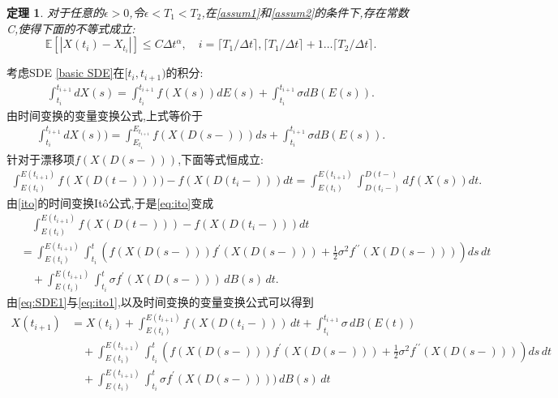 \documentclass[12pt,final]{article}
\makeatletter
\numberwithin{equation}{section}
\numberwithin{figure}{section}
\numberwithin{table}{section}
\theoremstyle{plain}
\renewcommand{\proofname}{证明}
\newtheorem{Theorem}{定理}[section]   %
\theoremstyle{Definition}
\theoremstyle{Remark}
\renewenvironment{proof}[1][\proofname]{\par
	\pushQED{\qed}%
	\normalfont \topsep6\p@\@plus6\p@\relax
	\trivlist\item[\hskip\labelsep
	\bfseries #1\@addpunct{\,:\,}]\ignorespaces
}{%
	\popQED\endtrivlist\@endpefalse
}
\makeatother
\begin{document}
	\begin{Theorem}\label{main th}
		对于任意的$\epsilon>0$,令$\epsilon < T_1 < T_2$,在\textnormal{\cref{assum1}}和\textnormal{\cref{assum2}}的条件下,存在常数C,使得下面的不等式成立:
		$$\mathbb{E}[|X({t_i})-X_{t_i}|]\le C\Delta t^\alpha,\quad i=\lceil T_1/\Delta t \rceil,\lceil T_1/\Delta t \rceil+1 \ldots \lceil T_2/\Delta t \rceil.$$
	\end{Theorem}
	\begin{proof}
		
		考虑SDE \eqref{basic SDE}在$[t_i,t_{i+1})$的积分:
		\begin{align}
			\int_{t_i}^{t_{i+1}}dX(s)=\int_{t_i}^{t_{i+1}}f(X(s))dE(s)+\int_{t_i}^{t_{i+1}}\sigma dB(E(s)).
		\end{align}
		由时间变换的变量变换公式\cite{kobayashi2011stochastic},上式等价于
		\begin{align}\label{eq:SDE1}
			\int_{t_i}^{t_{i+1}}dX(s))=\int_{E_{t_i}}^{E_{t_{i+1}}}f(X(D(s-)))ds+\int_{t_i}^{t_{i+1}}\sigma dB(E(s)).
		\end{align}
		针对于漂移项$f(X(D(s-)))$,下面等式恒成立:
		\begin{align}\label{eq:ito}
			\int_{E(t_i)}^{E(t_{i+1})} f(X(D(t-)))) - f(X(D(t_i-))) dt = \int_{E(t_i)}^{E(t_{i+1})} \int^{D(t-)}_{D(t_i-)} df(X(s)) dt.
		\end{align}
		由\cref{ito}的时间变换It\^{o}公式,于是\eqref{eq:ito}变成
		\begin{equation}\label{eq:ito1}
			\begin{aligned}
				&\quad\int_{E(t_i)}^{E(t_{i+1})} f(X(D(t-))) - f(X(D(t_i-))) dt \\
				&= \int_{E(t_i)}^{E(t_{i+1})} \int_{t_i}^{t} \left( f(X(D(s-))) f^{\prime}(X(D(s-))) + \frac{1}{2} \sigma^2 f^{\prime\prime}(X(D(s-))) \right) ds \,dt\\
				&\quad + \int_{E(t_i)}^{E(t_{i+1})} \int_{t_i}^{t} \sigma f^{\prime}(X(D(s-))) \,dB(s) \,dt . 
			\end{aligned}
		\end{equation}
		由\eqref{eq:SDE1}与\eqref{eq:ito1},以及时间变换的变量变换公式可以得到
		\begin{align*}
			X(t_{i+1}) 
			&= X(t_i) + \int_{E(t_i)}^{E(t_{i+1})} f(X({D(t_i-)})) \,dt + \int_{t_i}^{t_{i+1}} \sigma \,dB(E(t)) \\
			&\quad + \int_{E(t_i)}^{E(t_{i+1})} \int_{t_i}^{t}\left( f(X(D(s-))) f^{\prime}(X(D(s-))) + \frac{1}{2} \sigma^2 f^{\prime\prime}(X(D(s-))) \right) ds \,dt \\
			&\quad + \int_{E(t_i)}^{E(t_{i+1})} \int_{t_i}^{t}\sigma f^{\prime}(X(D(s-)))) \,dB(s) \,dt \\

\end{align*}
\end{proof}
\end{document}
